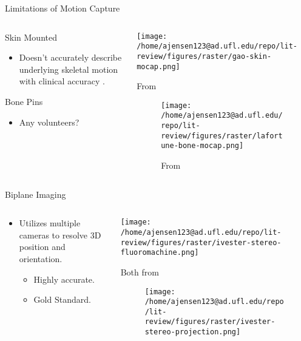 \documentclass[presentation, aspectratio=1610]{beamer}
\begin{document}
\begin{frame}[label={sec:org60bc9f6}]{Limitations of Motion Capture}
\begin{columns}
\begin{column}{0.5\columnwidth}
Skin Mounted
\begin{itemize}
\item Doesn't accurately describe underlying skeletal motion with clinical accuracy \autocites{gaoInvestigationSoftTissue2008}[][]{kuoInfluenceSoftTissue2011}[][]{linEffectsSoftTissue2016}.
\end{itemize}
Bone Pins
\begin{itemize}
\item Any volunteers?
\end{itemize}
\end{column}
\begin{column}{0.6\columnwidth}
\begin{center}
\texttt{[image: /home/ajensen123@ad.ufl.edu/repo/lit-review/figures/raster/gao-skin-mocap.png]}
\caption{From \autocite{gaoInvestigationSoftTissue2008}}
\end{center}
\vspace{-0.25in}
\begin{figure}[htbp]
\centering
\texttt{[image: /home/ajensen123@ad.ufl.edu/repo/lit-review/figures/raster/lafortune-bone-mocap.png]}
\caption{From \autocite{lafortuneThreedimensionalKinematicsHuman1992}}
\end{figure}
\end{column}
\end{columns}
\end{frame}
\begin{frame}[label={sec:org08360b6}]{Biplane Imaging}
\begin{columns}
\begin{column}{0.5\columnwidth}
\begin{itemize}
\item Utilizes multiple cameras to resolve 3D position and orientation\autocites{ivesterReconfigurableHighSpeedStereoRadiography2015}[][]{burtonAutomaticTrackingHealthy2021}.
\begin{itemize}
\item Highly accurate.
\item Gold Standard.
\end{itemize}
\end{itemize}
\end{column}
\begin{column}{0.6\columnwidth}
\begin{center}
\texttt{[image: /home/ajensen123@ad.ufl.edu/repo/lit-review/figures/raster/ivester-stereo-fluoromachine.png]}
\caption{Both from \autocite{ivesterReconfigurableHighSpeedStereoRadiography2015}}
\end{center}
\vspace{-0.25in}
\begin{figure}[htbp]
\centering
\texttt{[image: /home/ajensen123@ad.ufl.edu/repo/lit-review/figures/raster/ivester-stereo-projection.png]}
\end{figure}
\end{column}
\end{columns}
\end{frame}
\end{document}
